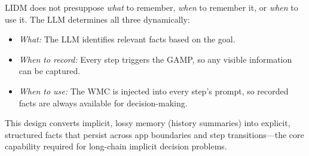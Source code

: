 LIDM does not presuppose \textit{what} to remember, \textit{when} to remember
it, or \textit{when} to use it. The LLM determines all three dynamically:
\begin{itemize}[leftmargin=*,noitemsep,topsep=2pt]
    \item \textit{What:} The LLM identifies relevant facts based on the goal.
    \item \textit{When to record:} Every step triggers the GAMP, so any
    visible information can be captured.
    \item \textit{When to use:} The WMC is injected into every step's prompt,
    so recorded facts are always available for decision-making.
\end{itemize}

This design converts implicit, lossy memory (history summaries) into explicit,
structured facts that persist across app boundaries and step transitions---the
core capability required for long-chain implicit decision problems.
